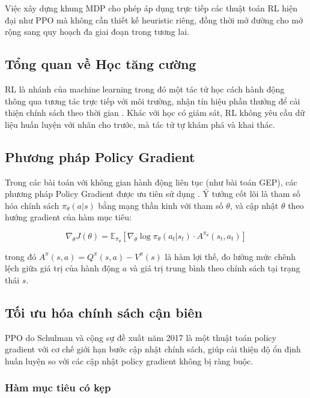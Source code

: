 Việc xây dựng khung MDP cho phép áp dụng trực tiếp các thuật toán RL hiện đại như PPO mà không cần thiết kế heuristic riêng, đồng thời mở đường cho mở rộng sang quy hoạch đa giai đoạn trong tương lai.
\fi

\subsection{Tổng quan về Học tăng cường}

RL là nhánh của machine learning trong đó một tác tử học cách hành động thông qua tương tác trực tiếp với môi trường, nhận tín hiệu phần thưởng để cải thiện chính sách theo thời gian \cite{sutton2018rl}. Khác với học có giám sát, RL không yêu cầu dữ liệu huấn luyện với nhãn cho trước, mà tác tử tự khám phá và khai thác.

\subsection{Phương pháp Policy Gradient}

Trong các bài toán với không gian hành động liên tục (như bài toán GEP), các phương pháp Policy Gradient được ưu tiên sử dụng \cite{schulman2015trpo}. Ý tưởng cốt lõi là tham số hóa chính sách $\pi_\theta(a|s)$ bằng mạng thần kinh với tham số $\theta$, và cập nhật $\theta$ theo hướng gradient của hàm mục tiêu:

\begin{equation}
    \nabla_\theta J(\theta) = \mathbb{E}_{\pi_\theta}\left[\nabla_\theta \log \pi_\theta(a_t | s_t) \cdot A^{\pi_\theta}(s_t, a_t)\right]
    \label{eq:policy_gradient}
\end{equation}

\noindent trong đó $A^{\pi}(s, a) = Q^{\pi}(s, a) - V^{\pi}(s)$ là hàm lợi thế, đo lường mức chênh lệch giữa giá trị của hành động $a$ và giá trị trung bình theo chính sách tại trạng thái $s$.

\subsection{Tối ưu hóa chính sách cận biên}

PPO do Schulman và cộng sự đề xuất năm 2017 \cite{schulman2017ppo} là một thuật toán policy gradient với cơ chế giới hạn bước cập nhật chính sách, giúp cải thiện độ ổn định huấn luyện so với các cập nhật policy gradient không bị ràng buộc.

\subsubsection{Hàm mục tiêu có kẹp}

